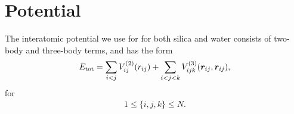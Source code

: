 
\section{Potential\label{sec:sio2_potential}}

The interatomic potential\cite{vashishta1990interaction}  we use for for both silica and water consists of two-body and three-body terms, and has the form
\begin{align*}
    E_\text{tot} = \sum_{i<j} V_{ij}^{(2)}(r_{ij}) + \sum_{i<j<k}V_{ijk}^{(3)}(\boldsymbol{r}_{ij},\boldsymbol{r}_{ij}),
\end{align*}
for
\begin{align*}
    1\leq \{i,j,k\} \leq N.
\end{align*}

